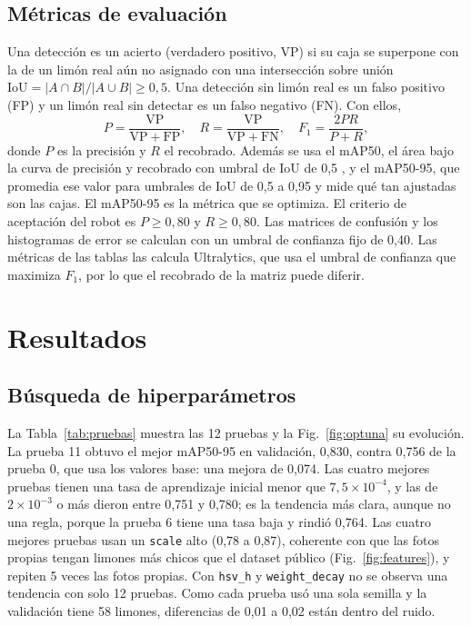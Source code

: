 \documentclass[conference]{IEEEtran}
\begin{document}
\subsection{Métricas de evaluación}
Una detección es un acierto (verdadero positivo, VP) si su caja se superpone con la de un limón real aún no asignado con una intersección sobre unión $\mathrm{IoU}=|A\cap B|/|A\cup B|\ge 0,5$. Una detección sin limón real es un falso positivo (FP) y un limón real sin detectar es un falso negativo (FN). Con ellos,
\begin{equation}
P=\frac{\mathrm{VP}}{\mathrm{VP}+\mathrm{FP}},\quad R=\frac{\mathrm{VP}}{\mathrm{VP}+\mathrm{FN}},\quad F_1=\frac{2PR}{P+R},
\end{equation}
donde $P$ es la precisión y $R$ el recobrado. Además se usa el mAP50, el área bajo la curva de precisión y recobrado con umbral de IoU de 0,5 \cite{everingham2010}, y el mAP50-95, que promedia ese valor para umbrales de IoU de 0,5 a 0,95 y mide qué tan ajustadas son las cajas. El mAP50-95 es la métrica que se optimiza. El criterio de aceptación del robot es $P\ge0,80$ y $R\ge0,80$. Las matrices de confusión y los histogramas de error se calculan con un umbral de confianza fijo de 0,40. Las métricas de las tablas las calcula Ultralytics, que usa el umbral de confianza que maximiza $F_1$, por lo que el recobrado de la matriz puede diferir.

\section{Resultados}
\subsection{Búsqueda de hiperparámetros}
La Tabla~\ref{tab:pruebas} muestra las 12 pruebas y la Fig.~\ref{fig:optuna} su evolución. La prueba 11 obtuvo el mejor mAP50-95 en validación, 0,830, contra 0,756 de la prueba 0, que usa los valores base: una mejora de 0,074. Las cuatro mejores pruebas tienen una tasa de aprendizaje inicial menor que $7,5\times10^{-4}$, y las de $2\times10^{-3}$ o más dieron entre 0,751 y 0,780; es la tendencia más clara, aunque no una regla, porque la prueba 6 tiene una tasa baja y rindió 0,764. Las cuatro mejores pruebas usan un \texttt{scale} alto (0,78 a 0,87), coherente con que las fotos propias tengan limones más chicos que el dataset público (Fig.~\ref{fig:features}), y repiten 5 veces las fotos propias. Con \texttt{hsv\_h} y \texttt{weight\_decay} no se observa una tendencia con solo 12 pruebas. Como cada prueba usó una sola semilla y la validación tiene 58 limones, diferencias de 0,01 a 0,02 están dentro del ruido.
\end{document}
